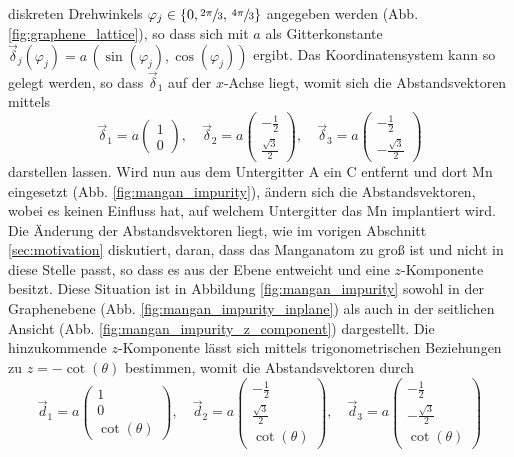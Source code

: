 diskreten Drehwinkels $\varphi_j \in \{ 0,  \sfrac{2\pi}{3}, \, \sfrac{4\pi}{3} \} $ angegeben werden (Abb. \ref{fig:graphene_lattice}), so dass sich mit $a$ als Gitterkonstante
$\vec{\delta}_j(\varphi_j) = a \, ( \sin (\varphi_j), \cos (\varphi_j) )$
ergibt.
Das Koordinatensystem kann so gelegt werden, so dass $\vec{\delta}_1$ auf der $x$-Achse liegt, womit sich die Abstandsvektoren mittels
\begin{equation*}
    \vec{\delta}_1 = a \begin{pmatrix} 1            \\[4pt] 0                   \end{pmatrix}, \quad
    \vec{\delta}_2 = a \begin{pmatrix} -\frac{1}{2} \\[4pt] \frac{\sqrt{3}}{2}  \end{pmatrix}, \quad 
    \vec{\delta}_3 = a \begin{pmatrix} -\frac{1}{2} \\[4pt] -\frac{\sqrt{3}}{2} \end{pmatrix}
\end{equation*}
darstellen lassen.
Wird nun aus dem Untergitter A ein C entfernt und dort Mn eingesetzt (Abb. \ref{fig:mangan_impurity}), 
ändern sich die Abstandsvektoren, wobei es keinen Einfluss hat, auf welchem Untergitter das Mn implantiert wird.
Die Änderung der Abstandsvektoren liegt, wie im vorigen Abschnitt \ref{sec:motivation} diskutiert, daran, dass das Manganatom zu groß ist 
und nicht in diese Stelle passt, so dass es aus der Ebene entweicht und 
eine $z$-Komponente besitzt.
Diese Situation ist in Abbildung \ref{fig:mangan_impurity} sowohl in der Graphenebene (Abb. \ref{fig:mangan_impurity_inplane}) als auch in der 
seitlichen Ansicht (Abb. \ref{fig:mangan_impurity_z_component}) dargestellt.
Die hinzukommende $z$-Komponente lässt sich mittels trigonometrischen Beziehungen zu $z = -\cot (\theta)$ bestimmen, womit die 
Abstandsvektoren durch 
\begin{equation}
    \vec{d}_1 = a \begin{pmatrix} 1            \\[4pt] 0                   \\[4pt] \cot (\theta)\end{pmatrix}, \quad
    \vec{d}_2 = a \begin{pmatrix} -\frac{1}{2} \\[4pt] \frac{\sqrt{3}}{2}  \\[4pt] \cot (\theta)\end{pmatrix}, \quad 
    \vec{d}_3 = a \begin{pmatrix} -\frac{1}{2} \\[4pt] -\frac{\sqrt{3}}{2} \\[4pt] \cot (\theta)\end{pmatrix}   \label{eqn:disvec}
\end{equation}
